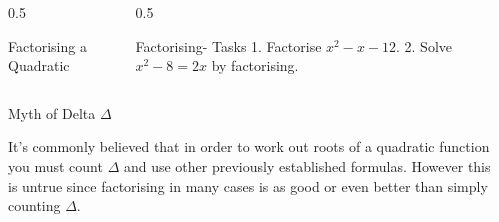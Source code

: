 \documentclass[final]{beamer}
\newlength{\sepwid}
\newlength{\onecolwid}
\begin{document}
\begin{frame}[t]
\begin{columns}[t]
\begin{column}{\onecolwid}
\begin{columns}[t,totalwidth=\onecolwid]
\begin{column}{0.5\onecolwid}
\begin{block}{Factorising a Quadratic}
          \end{block}


        \end{column} %

        \begin{column}{0.5\onecolwid}\vspace{-.6in} %


          \begin{block}{Factorising- Tasks}
            1. Factorise $x^2-x-12$.
            2. Solve $x^2-8=2x$ by factorising.

          \end{block}


        \end{column} %

      \end{columns} %


      \begin{alertblock}{Myth of Delta $\Delta$}

        It's commonly believed that in order to work out roots of a quadratic function you must count $\Delta$ and use other previously established formulas. However this is untrue since factorising in many cases is as good or even better than simply counting $\Delta$.

      \end{alertblock}

    \end{column} %

    \begin{column}{\sepwid}\end{column} %


\end{columns}
\end{frame}
\end{document}
